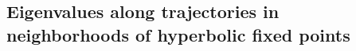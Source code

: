 \documentclass{article}
\theoremstyle{definition}
\begin{document}
\begin{refsection}












\subsection{Eigenvalues along trajectories in neighborhoods of hyperbolic fixed points}\label{subsec:theorem_vicinityHypFP}


\end{refsection}
\end{document}
